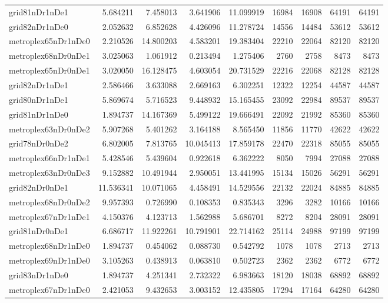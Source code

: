 \begin{longtable}{|l|r|r|r|r|r|r|r|r|}
grid81nDr1nDe1 & 5.684211 & 7.458013 & 3.641906 & 11.099919 & 16984 & 16908 & 64191 & 64191 \\
grid82nDr1nDe0 & 2.052632 & 6.852628 & 4.426096 & 11.278724 & 14556 & 14484 & 53612 & 53612 \\
metroplex65nDr1nDe0 & 2.210526 & 14.800203 & 4.583201 & 19.383404 & 22210 & 22064 & 82120 & 82120 \\
metroplex68nDr0nDe1 & 3.025063 & 1.061912 & 0.213494 & 1.275406 & 2760 & 2758 & 8473 & 8473 \\
metroplex65nDr0nDe1 & 3.020050 & 16.128475 & 4.603054 & 20.731529 & 22216 & 22068 & 82128 & 82128 \\
grid82nDr1nDe1 & 2.586466 & 3.633088 & 2.669163 & 6.302251 & 12322 & 12254 & 44587 & 44587 \\
grid80nDr1nDe1 & 5.869674 & 5.716523 & 9.448932 & 15.165455 & 23092 & 22984 & 89537 & 89537 \\
grid81nDr1nDe0 & 1.894737 & 14.167369 & 5.499122 & 19.666491 & 22092 & 21992 & 85360 & 85360 \\
metroplex63nDr0nDe2 & 5.907268 & 5.401262 & 3.164188 & 8.565450 & 11856 & 11770 & 42622 & 42622 \\
grid78nDr0nDe2 & 6.802005 & 7.813765 & 10.045413 & 17.859178 & 22470 & 22318 & 85055 & 85055 \\
metroplex66nDr1nDe1 & 5.428546 & 5.439604 & 0.922618 & 6.362222 & 8050 & 7994 & 27088 & 27088 \\
metroplex63nDr0nDe3 & 9.152882 & 10.491944 & 2.950051 & 13.441995 & 15134 & 15026 & 56291 & 56291 \\
grid82nDr0nDe1 & 11.536341 & 10.071065 & 4.458491 & 14.529556 & 22132 & 22024 & 84885 & 84885 \\
metroplex68nDr0nDe2 & 9.957393 & 0.726990 & 0.108353 & 0.835343 & 3296 & 3282 & 10166 & 10166 \\
metroplex67nDr1nDe1 & 4.150376 & 4.123713 & 1.562988 & 5.686701 & 8272 & 8204 & 28091 & 28091 \\
grid81nDr0nDe1 & 6.686717 & 11.922261 & 10.791901 & 22.714162 & 25114 & 24988 & 97199 & 97199 \\
metroplex68nDr1nDe0 & 1.894737 & 0.454062 & 0.088730 & 0.542792 & 1078 & 1078 & 2713 & 2713 \\
metroplex69nDr1nDe0 & 3.105263 & 0.438913 & 0.063810 & 0.502723 & 2362 & 2362 & 6772 & 6772 \\
grid83nDr1nDe0 & 1.894737 & 4.251341 & 2.732322 & 6.983663 & 18120 & 18038 & 68892 & 68892 \\
metroplex67nDr1nDe0 & 2.421053 & 9.432653 & 3.003152 & 12.435805 & 17294 & 17164 & 64280 & 64280 \\

\end{longtable}
